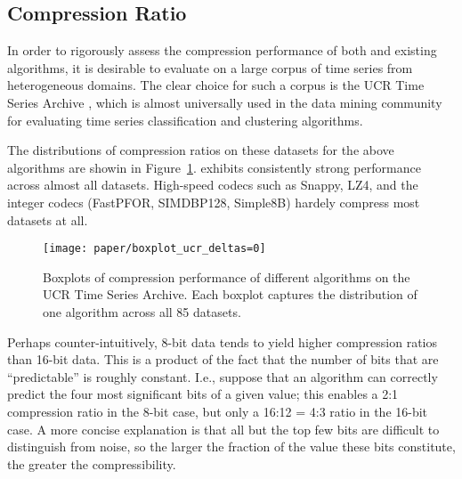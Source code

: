 

\subsection{Compression Ratio}

In order to rigorously assess the compression performance of both \minesp and existing algorithms, it is desirable to evaluate on a large corpus of time series from heterogeneous domains. The clear choice for such a corpus is the UCR Time Series Archive \cite{ucrTimeSeries}, which is almost universally used in the data mining community for evaluating time series classification and clustering algorithms.

The distributions of compression ratios on these datasets for the above algorithms are showin in Figure~\ref{fig:ratioBox}. \minesp exhibits consistently strong performance across almost all datasets. High-speed codecs such as Snappy, LZ4, and the integer codecs (FastPFOR, SIMDBP128, Simple8B) hardely compress most datasets at all.

\begin{figure}[h]
\begin{center}
    \texttt{[image: paper/boxplot\_ucr\_deltas=0]}
    \caption{Boxplots of compression performance of different algorithms on the UCR Time Series Archive. Each boxplot captures the distribution of one algorithm across all 85 datasets.}
    \label{fig:ratioBox}
\end{center}
\end{figure}

Perhaps counter-intuitively, 8-bit data tends to yield higher compression ratios than 16-bit data. This is a product of the fact that the number of bits that are ``predictable'' is roughly constant. I.e., suppose that an algorithm can correctly predict the four most significant bits of a given value; this enables a 2:1 compression ratio in the 8-bit case, but only a 16:12 = 4:3 ratio in the 16-bit case. A more concise explanation is that all but the top few bits are difficult to distinguish from noise, so the larger the fraction of the value these bits constitute, the greater the compressibility.

